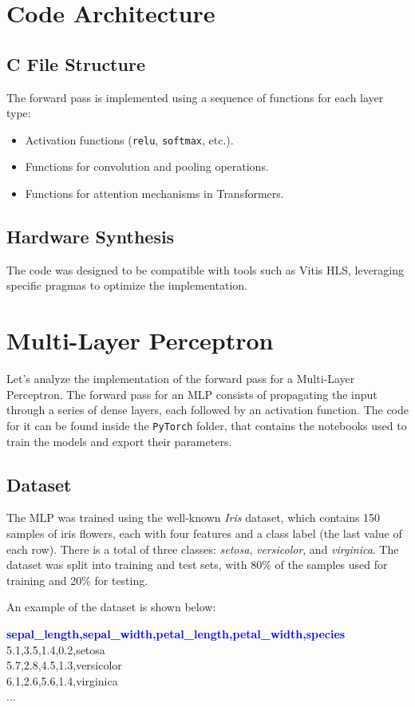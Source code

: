 \documentclass{article}
\begin{document}
\section{Code Architecture}
\subsection{C File Structure}
The forward pass is implemented using a sequence of functions for each layer type:
\begin{itemize}
    \item Activation functions (\texttt{relu}, \texttt{softmax}, etc.).
    \item Functions for convolution and pooling operations.
    \item Functions for attention mechanisms in Transformers.
\end{itemize}


\subsection{Hardware Synthesis}
The code was designed to be compatible with tools such as Vitis HLS, leveraging specific pragmas to optimize the implementation.

\section{Multi-Layer Perceptron}
Let's analyze the implementation of the forward pass for a Multi-Layer Perceptron. The forward pass for an MLP consists of propagating the input through a series of dense layers, each followed by an activation function.
The code for it can be found inside the \texttt{PyTorch} folder, that contains the notebooks used to train the models and export their parameters.

\subsection{Dataset}
The MLP was trained using the well-known \textit{Iris} dataset, which contains 150 samples of iris flowers, each with four features and a class label (the last value of each row).
There is a total of three classes: \textit{setosa}, \textit{versicolor}, and \textit{virginica}.
The dataset was split into training and test sets, with 80\% of the samples used for training and 20\% for testing.

An example of the dataset is shown below:

\begin{tcolorbox}[colback=gray!5, colframe=black, rounded corners, boxrule=0.1mm]
\textbf{\textcolor{blue}{sepal\_length,sepal\_width,petal\_length,petal\_width,species}} \\
5.1,3.5,1.4,0.2,setosa \\
5.7,2.8,4.5,1.3,versicolor \\
6.1,2.6,5.6,1.4,virginica \\
...
\end{tcolorbox}
\end{document}
